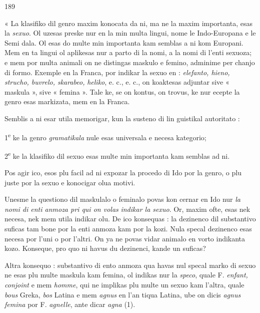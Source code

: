 \begin{VUpage}[193]{189}

« La klasifiko dil genro maxim konocata da ni, ma ne\nl
la maxim importanta, esas la \textit{sexuo}. Ol uzesas preske nur\nl
en la min multa lingui, nome le Indo-Europana e le Semi\cc
dala. Ol esas do multe min importanta kam semblas a ni\nl
kom Europani. Mem en ta lingui ol aplikesas nur a parto\nl
di la nomi, a la nomi di l'enti sexuoza; e mem por multa\nl
animali on ne distingas maskulo e femino, adminime per\nl
chanjo di formo. Exemple en la Franca, por indikar la\nl
sexuo en : \textit{elefanto, hieno, strucho, buvrelo, skarabeo,}\nl
\textit{heliko}, e. c., e. c., on koaktesas adjuntar sive « maskula »,\nl
sive « femina ». Tale ke, se on kontus, on trovus, ke nur\nl
ecepte la genro esas markizata, mem en la Franca.

Semblis a ni esar utila memorigar, kun la susteno di lin\cc
guistikal autoritato :

1\textsuperscript{e} ke la genro \textit{gramatikala} nule esas universala e necesa\nl
kategorio;

2\textsuperscript{e} ke la klasifiko dil sexuo esas multe min importanta\nl
kam semblas ad ni.

Pos agir ico, esos plu facil ad ni expozar la procedo di\nl
Ido por la genro, o plu juste por la sexuo e konocigar olua\nl
motivi.

Unesme la questiono dil maskulalo o feminalo povas kon\cc
cernar en Ido nur \textit{la nomi di enti anmoza pri qui on volas}\nl
\textit{indikar la sexuo}. Or, maxim ofte, esas nek necesa, nek mem\nl
utila indikar olu. De ico konsequas : la dezinenco  dil\nl
substantivo suficas tam bone por la enti anmoza kam por\nl
la kozi. Nula specal dezinenco esas necesa por l'uni o por\nl
l'altri. On ya ne povas vidar animalo en vorto indikanta\nl
kozo. Konseque, pro quo ni havus du dezinenci, kande un\nl
suficas?

Altra konsequo : substantivo di ento anmoza qua havas\nl
nul specal marko di sexuo ne esas plu multe maskula kam\nl
femina, ol indikas nur la \textit{speco}, quale F. \textit{enfant, conjoint}\nl
e mem \textit{homme}, qui ne implikas plu multe un sexuo kam\nl
l'altra, quale \textit{bous} Greka, \textit{bos} Latina e mem \textit{agnus} en l'an\cc
tiqua Latina, ube on dicis \textit{agnus femina} por F. \textit{agnelle}, ante\nl
dicar \textit{agna} (1).
\end{VUpage}

